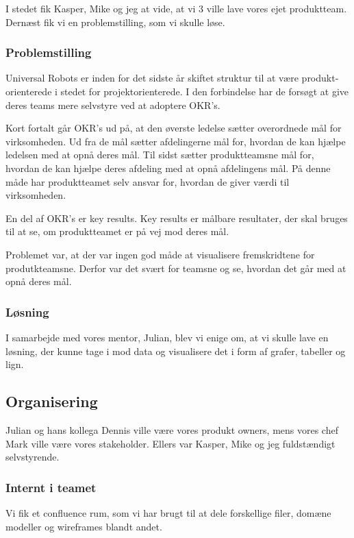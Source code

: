 \documentclass[a4paper]{article}
\begin{document}
I stedet fik Kasper, Mike og jeg at vide,
at vi 3 ville lave vores ejet produktteam.
Dernæst fik vi en problemstilling, som vi skulle løse.

\subsubsection{Problemstilling}
Universal Robots er inden for det sidste år skiftet struktur til at være 
produkt-orienterede i stedet for projektorienterede.
I den forbindelse har de forsøgt at give deres teams mere selvstyre ved at 
adoptere OKR's.

Kort fortalt går OKR's ud på, 
at den øverste ledelse sætter overordnede mål for virksomheden.
Ud fra de mål sætter afdelingerne mål for,
hvordan de kan hjælpe ledelsen med at opnå deres mål.
Til sidst sætter produktteamsne mål for, 
hvordan de kan hjælpe deres afdeling med at opnå afdelingens mål.
På denne måde har produktteamet selv ansvar for,
hvordan de giver værdi til virksomheden.

En del af OKR's er key results. 
Key results er målbare resultater, der skal bruges til at se,
om produktteamet er på vej mod deres mål.

Problemet var, at der var ingen god måde at visualisere 
fremskridtene for produtkteamsne.
Derfor var det svært for teamsne og se, hvordan det går med at opnå deres mål.

\subsubsection{Løsning}
I samarbejde med vores mentor, Julian, blev vi enige om, at vi skulle lave en 
løsning, der kunne tage i mod data og visualisere det i form af 
grafer, tabeller og lign.

\subsection{Organisering}
Julian og hans kollega Dennis ville være vores produkt owners,
mens vores chef Mark ville være vores stakeholder.
Ellers var Kasper, Mike og jeg fuldstændigt selvstyrende.

\subsubsection{Internt i teamet}
Vi fik et confluence rum, som vi har brugt til at dele forskellige filer, 
domæne modeller og wireframes blandt andet.
\end{document}
